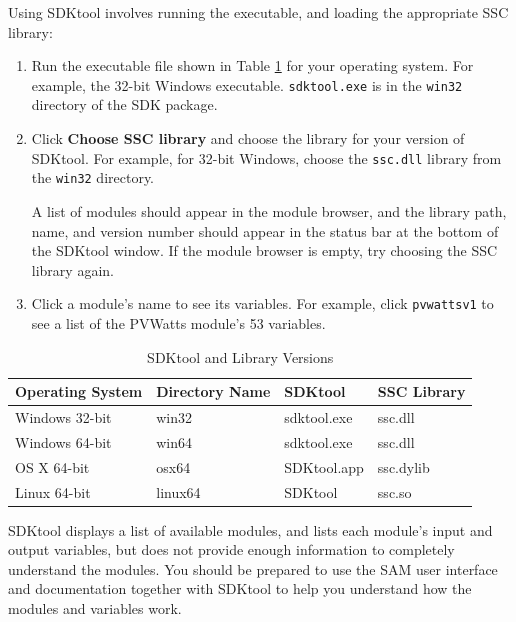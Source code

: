 \documentclass{scrartcl} %
\newcommand{\+}{\discretionary{\mbox{\scriptsize$\hookleftarrow$}}{}{}}
\begin{document}
Using SDKtool involves running the executable, and loading the appropriate SSC library:

\begin{enumerate}
\item Run the executable file shown in Table \ref{tab_sdktool_versions} for your operating system. For example, the 32-bit Windows executable. \texttt{sdktool.exe} is in the \texttt{win32} directory of the SDK package.
\item Click \textbf{Choose SSC library} and choose the library for your version of SDKtool. For example, for 32-bit Windows, choose the \texttt{ssc.dll} library from the \texttt{win32} directory.

A list of modules should appear in the module browser, and the library path, name, and version number should appear in the status bar at the bottom of the SDKtool window. If the module browser is empty, try choosing the SSC library again.
\item Click a module's name to see its variables. For example, click \texttt{pvwattsv1} to see a list of the PVWatts module's 53 variables.
\end{enumerate}

\begin{table}
  \begin{center}
    \begin{tabular}{llll}
       Operating System & Directory Name & SDKtool & SSC Library \\
       \hline
       Windows 32-bit & win32 & sdktool.exe & ssc.dll \\
       Windows 64-bit & win64 & sdktool.exe & ssc.dll \\
       OS X 64-bit & osx64 & SDKtool.app & ssc.dylib \\
       Linux 64-bit & linux64 & SDKtool & ssc.so \\ 
      \hline
    \end{tabular}
    \caption{SDKtool and Library Versions}\label{tab_sdktool_versions}
  \end{center}
\end{table}

SDKtool displays a list of available modules, and lists each module's input and output variables, but does not provide enough information to completely understand the modules. You should be prepared to use the SAM user interface and documentation together with SDKtool to help you understand how the modules and variables work. 
\end{document}

